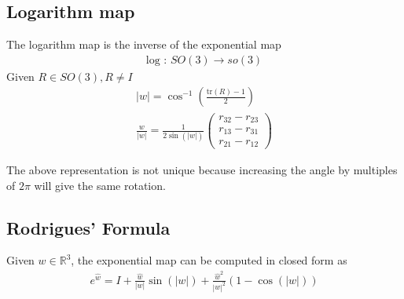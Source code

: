 \documentclass{report}
\begin{document}
\subsection{Logarithm map}
The logarithm map is the inverse of the exponential map
\begin{align}
    \text{log : } SO(3) \rightarrow so(3)
\end{align}
Given $R \in SO(3), R \neq I$
\begin{align}
    \lvert w \rvert = \cos^{-1}\left( \frac{\text{tr}(R) - 1}{2} \right) \\
    \frac{w}{\lvert w \rvert} = \frac{1}{2\sin(\lvert w \rvert)} 
    \left(
    \begin{matrix}
        r_{32} - r_{23}\\
        r_{13} - r_{31}\\
        r_{21} - r_{12}
    \end{matrix}
    \right)
\end{align}

\noindent The above representation is not unique because increasing the angle by multiples of 
$2\pi$ will give the same rotation.

\subsection{Rodrigues' Formula}
Given $w \in \mathbb{R}^3$, the exponential map can be computed in closed form as
\begin{align}
    e^{\hat{w}} = I + \frac{\hat{w}}{|w|}\sin(|w|) + \frac{\hat{w}^2}{|w|^2}(1-\cos(|w|))
\end{align}
\end{document}
